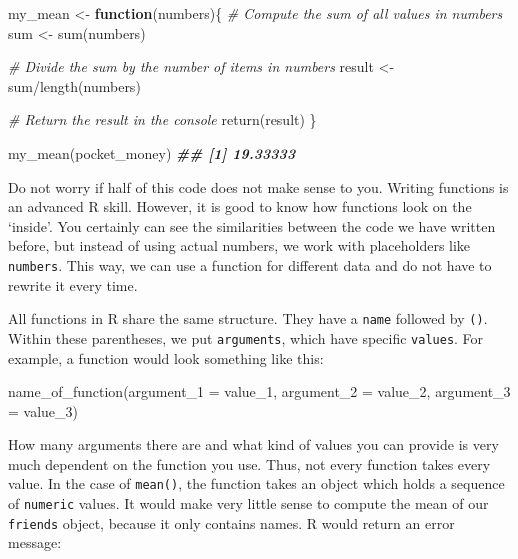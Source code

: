 \documentclass[
]{book}
\newenvironment{Shaded}{\begin{snugshade}}{\end{snugshade}}
\newcommand{\AttributeTok}[1]{\textcolor[rgb]{0.77,0.63,0.00}{#1}}
\newcommand{\CommentTok}[1]{\textcolor[rgb]{0.56,0.35,0.01}{\textit{#1}}}
\newcommand{\ControlFlowTok}[1]{\textcolor[rgb]{0.13,0.29,0.53}{\textbf{#1}}}
\newcommand{\DocumentationTok}[1]{\textcolor[rgb]{0.56,0.35,0.01}{\textbf{\textit{#1}}}}
\newcommand{\FunctionTok}[1]{\textcolor[rgb]{0.00,0.00,0.00}{#1}}
\newcommand{\NormalTok}[1]{#1}
\newcommand{\OtherTok}[1]{\textcolor[rgb]{0.56,0.35,0.01}{#1}}
\newcommand{\SpecialCharTok}[1]{\textcolor[rgb]{0.00,0.00,0.00}{#1}}
\begin{document}
\begin{Shaded}
\begin{Highlighting}[]
\NormalTok{my\_mean }\OtherTok{\textless{}{-}} \ControlFlowTok{function}\NormalTok{(numbers)\{}
  \CommentTok{\# Compute the sum of all values in \textquotesingle{}numbers\textquotesingle{}}
\NormalTok{  sum }\OtherTok{\textless{}{-}} \FunctionTok{sum}\NormalTok{(numbers)}
  
  \CommentTok{\# Divide the sum by the number of items in \textquotesingle{}numbers\textquotesingle{}}
\NormalTok{  result }\OtherTok{\textless{}{-}}\NormalTok{ sum}\SpecialCharTok{/}\FunctionTok{length}\NormalTok{(numbers)}
  
  \CommentTok{\# Return the result in the console}
  \FunctionTok{return}\NormalTok{(result)}
\NormalTok{\}}

\FunctionTok{my\_mean}\NormalTok{(pocket\_money)}
\DocumentationTok{\#\# [1] 19.33333}
\end{Highlighting}
\end{Shaded}

Do not worry if half of this code does not make sense to you. Writing functions is an advanced R skill. However, it is good to know how functions look on the `inside'. You certainly can see the similarities between the code we have written before, but instead of using actual numbers, we work with placeholders like \texttt{numbers}. This way, we can use a function for different data and do not have to rewrite it every time.

All functions in R share the same structure. They have a \texttt{name} followed by \texttt{()}. Within these parentheses, we put \texttt{arguments}, which have specific \texttt{values}. For example, a function would look something like this:

\begin{Shaded}
\begin{Highlighting}[]
\FunctionTok{name\_of\_function}\NormalTok{(}\AttributeTok{argument\_1 =}\NormalTok{ value\_1,}
                 \AttributeTok{argument\_2 =}\NormalTok{ value\_2,}
                 \AttributeTok{argument\_3 =}\NormalTok{ value\_3)}
\end{Highlighting}
\end{Shaded}

How many arguments there are and what kind of values you can provide is very much dependent on the function you use. Thus, not every function takes every value. In the case of \texttt{mean()}, the function takes an object which holds a sequence of \texttt{numeric} values. It would make very little sense to compute the mean of our \texttt{friends} object, because it only contains names. R would return an error message:
\end{document}
